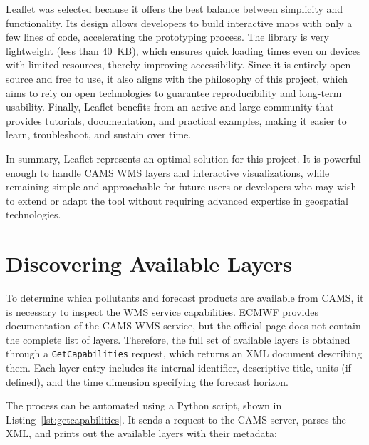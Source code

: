 Leaflet was selected because it offers the best balance between simplicity and functionality. Its design allows developers to build interactive maps with only a few lines of code, accelerating the prototyping process. The library is very lightweight (less than 40~KB), which ensures quick loading times even on devices with limited resources, thereby improving accessibility. Since it is entirely open-source and free to use, it also aligns with the philosophy of this project, which aims to rely on open technologies to guarantee reproducibility and long-term usability. Finally, Leaflet benefits from an active and large community that provides tutorials, documentation, and practical examples, making it easier to learn, troubleshoot, and sustain over time.  

In summary, Leaflet represents an optimal solution for this project. It is powerful enough to handle CAMS WMS layers and interactive visualizations, while remaining simple and approachable for future users or developers who may wish to extend or adapt the tool without requiring advanced expertise in geospatial technologies.  


\section{Discovering Available Layers}

To determine which pollutants and forecast products are available from CAMS, it is necessary to inspect the WMS service capabilities. ECMWF provides documentation of the CAMS WMS service, but the official page does not contain the complete list of layers. Therefore, the full set of available layers is obtained through a \texttt{GetCapabilities} request, which returns an XML document describing them. Each layer entry includes its internal identifier, descriptive title, units (if defined), and the time dimension specifying the forecast horizon.


The process can be automated using a Python script, shown in Listing~\ref{lst:getcapabilities}. It sends a request to the CAMS server, parses the XML, and prints out the available layers with their metadata:

